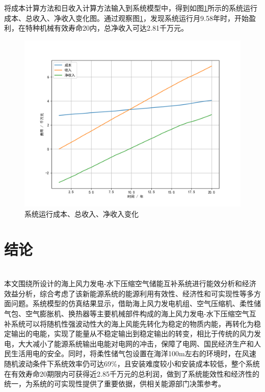 \documentclass[journal,onecolumn]{IEEEtran}
\begin{document}
将成本计算方法和日收入计算方法输入到系统模型中，得到如图\ref{fig:screenshot031}所示的系统运行成本、总收入、净收入变化图。通过观察图\ref{fig:screenshot031}，发现系统运行月9.58年时，开始盈利，在特种机械有效寿命20内，总净收入可达2.81千万元。

\begin{figure}[ht]
	\centering
	\includegraphics[width=0.7\linewidth]{pictures/screenshot031}
	\caption{系统运行成本、总收入、净收入变化}
	\label{fig:screenshot031}
\end{figure}
\newpage
\section{结论}\ \\

本文围绕所设计的海上风力发电-水下压缩空气储能互补系统进行能效分析和经济效益分析，综合考虑了该新能源系统的能源利用有效性、经济性和可实现性等多方面问题。系统模型的仿真结果显示，借助海上风力发电机组、空气压缩机、柔性储气包、空气膨胀机、换热器等主要机械部件构成的海上风力发电-水下压缩空气互补系统可以将随机性强波动性大的海上风能先转化为稳定的物质内能，再转化为稳定输出的电能，实现了能量从不稳定输出到稳定输出的转变，相比于传统的风力发电，大大减小了能源系统输出电能对电网的冲击，保障了电网、国民经济生产和人民生活用电的安全。同时，将柔性储气包设置在海洋100m左右的环境时，在风速随机波动条件下系统效率仍可达69\%，且安装难度较小和安装成本较低，整个系统在有效寿命20期限内可获得近2.85千万元的总利润，做到了系统能效性和经济性的统一，为系统的可实现性提供了重要依据，供相关能源部门决策参考。
\end{document}

